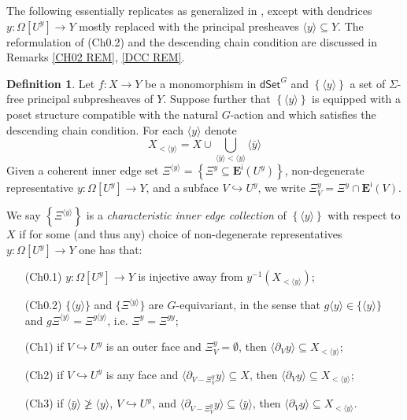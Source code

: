 \documentclass[a4paper,10pt
,draft
]{article}%
\numberwithin{equation}{section}
\numberwithin{figure}{section}
\theoremstyle{definition} %
\newtheorem{definition}[equation]{Definition}%
\newcommand{\1}{\ensuremath{\mathbbm 1}}%
\begin{document}
The following essentially replicates \cite[Def. 3.1]{BP_edss} as generalized in \cite[Rem. 3.7]{BP_edss},
except with dendrices
$y \colon \Omega[U^y] \to Y$
mostly replaced with the principal presheaves
$\langle y \rangle \subseteq Y$. 
The reformulation of (Ch0.2) and the descending chain condition
are discussed in Remarks \ref{CH02 REM}, \ref{DCC REM}.

\begin{definition}\label{CHAREDGE DEF}
	Let $f\colon X \to Y$ be a monomorphism in 
	$\mathsf{dSet}^G$ and 
	$\left\{ \langle y \rangle\right\}$
	a set of $\Sigma$-free principal subpresheaves of $Y$. 
	Suppose further that 
	$\left\{ \langle y \rangle \right\}$ is equipped 
	with a poset structure compatible with the natural $G$-action
	and which satisfies the descending chain condition.
	For each $\langle y \rangle$ denote
	\[
	X_{< \langle y \rangle} = X \cup 
	\bigcup_{\langle\bar{y}\rangle < \langle y \rangle} \langle \bar{y} \rangle
	\]
	Given a coherent inner edge set 
	$
	\Xi^{\langle y \rangle} =
	\left\{ \Xi^y \subseteq \boldsymbol{E}^{\mathsf{i}}(U^y)\right\}$,
	non-degenerate representative
	$y \colon \Omega[U^y] \to Y$, and a subface $V \hookrightarrow U^y$,
	we write
	$\Xi^y_V = \Xi^y \cap \boldsymbol{E}^{\mathsf{i}}(V)$.
	
	We say
	$
	\left\{ \Xi^{\langle y \rangle} \right \} 
	$
	is a \emph{characteristic inner edge collection} 
	of $\left\{ \langle y \rangle \right\}$ with respect to $X$ if
	for some (and thus any) choice of non-degenerate representatives
	$y\colon \Omega[U^y] \to Y$ one has that:
	\begin{enumerate}
		\item[(Ch0.1)] $y \colon \Omega[U^y] \to Y$ is injective away from
		$y^{-1}\left( X_{< \langle y \rangle} \right)$; 
		\item[(Ch0.2)]
		$\{\langle y\rangle\}$ and
		$\{\Xi^{\langle y \rangle}\}$ are $G$-equivariant, in the sense that
		$g\langle y\rangle \in \{\langle y\rangle\}$ and 
		$g \Xi^{\langle y \rangle} =
		\Xi^{g \langle y \rangle}$,
		i.e. $\Xi^y = \Xi^{gy}$;
		\item[(Ch1)] if $V \hookrightarrow U^y$ is an outer face and $\Xi^y_V = \emptyset$,
		then $\langle \partial_V y \rangle \subseteq X_{< \langle y \rangle}$;
		\item[(Ch2)] if $V \hookrightarrow U^y$ is any face and
		$\langle \partial_{V-\Xi^y_V} y\rangle \subseteq X$,
		then
		$\langle \partial_V y\rangle \subseteq X_{< \langle y \rangle}$;
		\item[(Ch3)] if $\langle \bar{y} \rangle \not \geq \langle y \rangle$,
		$V \hookrightarrow U^y$,
		and
		$\langle \partial_{V-\Xi^y_V} y\rangle \subseteq \langle \bar{y} \rangle$,
		then
		$\langle \partial_V y\rangle \subseteq X_{< \langle y \rangle}$.
	\end{enumerate}
\end{definition}
\end{document}
